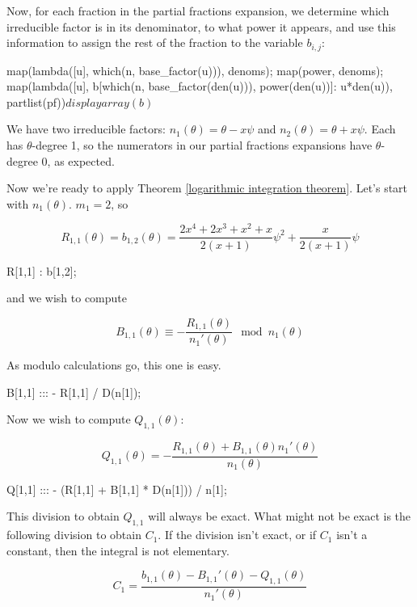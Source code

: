Now, for each fraction in the partial fractions
expansion, we determine which irreducible
factor is in its denominator, to what power
it appears, and use this information to
assign the rest of the fraction to the
variable $b_{i,j}$:

\begin{maximacode}
map(lambda([u], which(n, base_factor(u))), denoms);
map(power, denoms);
map(lambda([u],
       b[which(n, base_factor(den(u))),
         power(den(u))]: u*den(u)),
    partlist(pf))$
displayarray(b)$
\end{maximacode}


We have two irreducible factors: $n_1(\theta) = \theta - x \psi$ and
$n_2(\theta) = \theta + x \psi$.  Each has $\theta$-degree 1, so
the numerators in our partial fractions expansions have
$\theta$-degree 0, as expected.

Now we're ready to apply
Theorem \ref{logarithmic integration theorem}.  Let's start with
$n_1(\theta)$.  $m_1=2$, so

$$R_{1,1}(\theta) = b_{1,2}(\theta) = \frac{2x^4+2x^3+x^2+x}{2(x+1)}\psi^2 + \frac{x}{2(x+1)} \psi$$

\begin{maximacode}
R[1,1] : b[1,2];
\end{maximacode}

and we wish to compute

$$ B_{1,1}(\theta) \equiv - \frac{R_{1,1}(\theta)}{n_1'(\theta) } \mod n_1(\theta)$$

As modulo calculations go, this one is easy.

\begin{maximacode}
B[1,1] ::: - R[1,1] / D(n[1]);
\end{maximacode}

Now we wish to compute $Q_{1,1}(\theta)$:

$$ Q_{1,1}(\theta) = - \frac{R_{1,1}(\theta) + B_{1,1}(\theta) n_1'(\theta)}{n_1(\theta)}$$

\begin{maximacode}
Q[1,1] :::
   - (R[1,1] + B[1,1] * D(n[1])) / n[1];
\end{maximacode}

This division to obtain $Q_{1,1}$ will always be exact.  What might not be exact is the following division
to obtain $C_{1}$.  If the division isn't exact, or if $C_1$ isn't a constant, then the integral is not elementary.

$$ C_1 = \frac{b_{1,1}(\theta) - B_{1,1}'(\theta) - Q_{1,1}(\theta)}{n_1'(\theta)} $$

